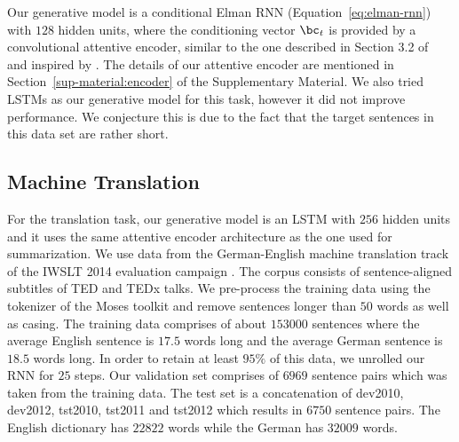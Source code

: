 Our generative model is a conditional Elman RNN (Equation~\ref{eq:elman-rnn}) with $128$ hidden units, 
where the conditioning vector $\bc_t$  is provided by a convolutional attentive encoder, 
similar to the one described in Section 3.2 of ~\citet{rush-2015} and inspired by 
\cite{bahdanau-iclr2015}. The details of our attentive 
encoder are mentioned in Section~\ref{sup-material:encoder} of the Supplementary Material.
We also tried LSTMs as our generative model for this task, however it did not improve performance. We conjecture this is due to the fact that the target sentences in this data set are rather short.

\subsection{Machine Translation}
For the translation task, our generative model is an LSTM with $256$ hidden units and it uses the same attentive encoder architecture as the one used for summarization. 
We use data from the German-English machine translation track of the
IWSLT 2014 evaluation campaign \citep{cettolo2014}.
The corpus consists of sentence-aligned subtitles of TED and TEDx 
talks. We pre-process the training data using the tokenizer of the Moses 
toolkit \citep{koehn2007} and remove sentences longer than $50$ words as well as casing.  
The training data comprises of about $153000$ sentences where the average English 
sentence is $17.5$ words long and the average German sentence is 
$18.5$ words long. In order to retain at least $95\%$ of this data, we unrolled our RNN for $25$ steps.
Our validation set comprises of $6969$ sentence pairs which was taken from the training data. The test set is a concatenation of dev2010, dev2012, tst2010, tst2011 and tst2012 
which results in $6750$ sentence pairs. The English dictionary has $22822$ words while the German has $32009$ words. 
